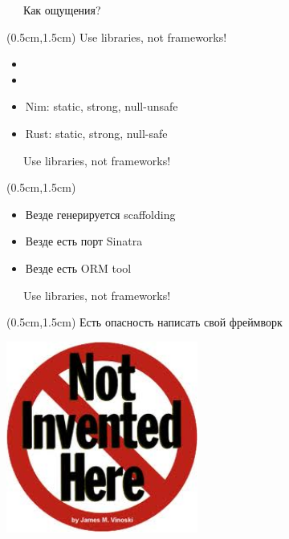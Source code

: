 \documentclass[xetex,18pt,aspectratio=43]{beamer}
\begin{document}
\begin{Large}
\begin{frame}{\ \ \ Как ощущения?}
\begin{textblock*}{\framewidth-0.8cm}(0.5cm,1.5cm)
Use libraries, not frameworks!
\begin{itemize}
  \item {\color{gray}{Clojure: dynamic, strong}}
  \item {\color{gray}{Elixir: dynamic, strong}}
  \item Nim: static, strong, null-unsafe
  \item Rust: static, strong, null-safe
\end{itemize}
\end{textblock*}
\end{frame}

\begin{frame}{\ \ \ Use libraries, not frameworks!}
\begin{textblock*}{\framewidth-0.8cm}(0.5cm,1.5cm)
\begin{itemize}
  \item Везде генерируется scaffolding    
  \item Везде есть порт Sinatra
  \item Везде есть ORM tool
\end{itemize}
\end{textblock*}
\end{frame}

\begin{frame}{\ \ \ Use libraries, not frameworks!}
\begin{textblock*}{\framewidth}(0.5cm,1.5cm)
  Есть опасность написать свой фреймворк
\begin{minipage}{\textwidth}
  \centering
  \includegraphics[height=6.3cm]{img/nih}
\end{minipage}
\end{textblock*}
\end{frame}


\end{Large}
\end{document}

